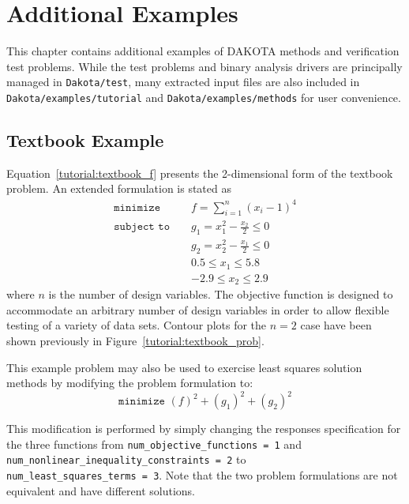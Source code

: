 \chapter{Additional Examples}\label{additional}

This chapter contains additional examples of DAKOTA methods and
verification test problems.  While the test problems and binary
analysis drivers are principally managed in {\tt Dakota/test}, many
extracted input files are also included in {\tt
Dakota/examples/tutorial} and {\tt Dakota/examples/methods} for user
convenience.

\section{Textbook Example}\label{additional:textbook}

Equation~\ref{tutorial:textbook_f} presents the 2-dimensional
form of the textbook problem.  An extended formulation is stated as
\begin{eqnarray}
\texttt{minimize }   & & f = \sum_{i=1}^{n}(x_i-1)^4 \nonumber\\
\texttt{subject to } & & g_1 = x_1^2-\frac{x_2}{2} \leq 0
  \label{additional:tbe}\\
  & & g_2=x_2^2-\frac{x_1}{2} \leq 0\nonumber\\
  & & 0.5 \leq x_1 \leq 5.8\nonumber\\
  & & -2.9 \leq x_2 \leq 2.9\nonumber
\end{eqnarray}
where $n$ is the number of design variables. The objective function is
designed to accommodate an arbitrary number of design variables in
order to allow flexible testing of a variety of data sets. Contour
plots for the $n=2$ case have been shown previously in
Figure~\ref{tutorial:textbook_prob}.

This example problem may also be used to exercise least squares
solution methods by modifying the problem formulation to:
\begin{equation}
\texttt{minimize } (f)^2+(g_1)^2+(g_2)^2 \label{additional:tbls}
\end{equation}

This modification is performed by simply changing the responses
specification for the three functions from
\texttt{num\_objective\_functions = 1} and
\texttt{num\_nonlinear\_inequality\_constraints = 2} to \\
\texttt{num\_least\_squares\_terms = 3}. Note that the two problem
formulations are not equivalent and have different solutions.

